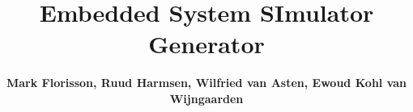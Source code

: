 \documentclass{beamer}
\title[]{\Large Embedded System SImulator Generator}
\author[]{\LARGE \textbf{
	Mark Florisson,
	Ruud Harmsen,
	Wilfried van Asten,
	Ewoud Kohl van Wijngaarden
  }}
\institute{\Large \vfill {Ontwerpproject (192199109) -- Faculty of Electrical Engineering -- University of Twente} }
\date{}
\begin{document}
  \begin{frame}{}

\vspace{-1cm}
\begin{columns}[t]
\begin{column}{.02\linewidth}\end{column}
\begin{column}{.97\linewidth}\end{column}
\begin{column}{.02\linewidth}\end{column}
\end{columns}

\linewidth

\begin{columns}[t]
\begin{column}{.02\linewidth}\end{column}
\begin{column}{.313\linewidth}\end{column}
\begin{column}{.01\linewidth}\end{column}
\begin{column}{.313\linewidth}\end{column}
\begin{column}{.01\linewidth}\end{column}
\begin{column}{.313\linewidth}\end{column}
\begin{column}{.02\linewidth}\end{column}
\end{columns}

{}\linewidth

\begin{columns}[t]
\begin{column}{.02\linewidth}\end{column}
\begin{column}{.475\linewidth}\end{column}
\begin{column}{.01\linewidth}\end{column}
\begin{column}{0.475\linewidth}\end{column}
\begin{column}{.02\linewidth}\end{column}
\end{columns}


\end{frame}
\end{document}
